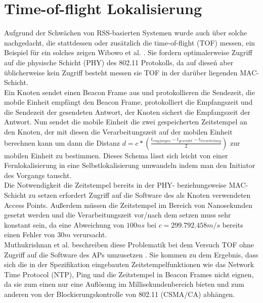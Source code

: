 \section{Time-of-flight Lokalisierung}
\label{ch:Vorherige:sec:TOF}
Aufgrund der Schwächen von RSS-basierten Systemen wurde auch über solche nachgedacht, die stattdessen oder zusätzlich die time-of-flight (TOF) messen, ein Beispiel für ein solches zeigen Wibowo et al. \cite{wibowo2009time}. 
Sie fordern optimalerweise Zugriff auf die physische Schicht (PHY) des 802.11 Protokolls, da auf dieseń aber üblicherweise kein Zugriff besteht messen sie TOF in der darüber liegenden MAC-Schicht.\\
Ein Knoten sendet einen Beacon Frame aus und protokollieren die Sendezeit, die mobile Einheit empfängt den Beacon Frame, protokolliert die Empfangszeit und die Sendezeit der gesendeten Antwort, der Knoten sichert die Empfangszeit der Antwort.
Nun sendet die mobile Einheit die zwei gespeicherten Zeitstempel an den Knoten, der mit diesen die Verarbeitungszeit auf der mobilen Einheit berechnen kann um dann die Distanz $d = c*(\frac{t_{empfangen} - t_{gesendet} - t_{Verarbeitung}}{2})$ zur mobilen Einheit zu bestimmen.
Dieses Schema lässt sich leicht von einer Fernlokalisierung in eine Selbstlokalisierung umwandeln indem man den Initiator des Vorgangs tauscht.\\
Die Notwendigkeit die Zeitstempel bereits in der PHY- beziehungsweise MAC-Schicht zu setzen erfordert Zugriff auf die Software des als Knoten verwendeten Access Points. 
Außerdem müssen die Zeitstempel im Bereich von Nanosekunden gesetzt werden und die Verarbeitungszeit vor/nach dem setzen muss sehr konstant sein, da eine Abweichung von $100ns$ bei $c = 299.792.458m/s$ bereits einen Fehler von $30m$ verursacht.\\
Muthukrishnan et al. beschreiben diese Problematik bei dem Versuch TOF ohne Zugriff auf die Software des APs umzusetzen \cite{muthukrishnan2006using}.
Sie kommen zu dem Ergebnis, dass sich die in der Spezifikation eingebauten Zeitstempelfunktionen wie das Network Time Protocol (NTP), Ping und die Zeitstempel in Beacon Frames nicht eignen, da sie zum einen nur eine Auflösung im Millisekundenbereich bieten und zum anderen von der Blockierungskontrolle von 802.11 (CSMA/CA) abhängen.

